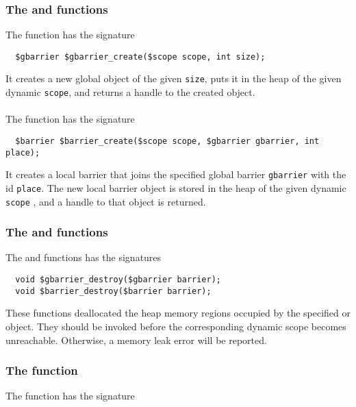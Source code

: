 \subsubsection{The \cgbarriercreate{} and \cbarriercreate{} functions}
The \cgbarriercreate{} function has the signature

\begin{verbatim}
  $gbarrier $gbarrier_create($scope scope, int size);
\end{verbatim}

It creates a new global object of the given \texttt{size}, puts it in the heap of the given dynamic \texttt{scope}, and returns a handle to the created \cgbarrier{} object.
\\~\\
The \cbarriercreate{} function has the signature

\begin{verbatim}
  $barrier $barrier_create($scope scope, $gbarrier gbarrier, int place);
\end{verbatim}

It creates a local barrier that joins the specified global barrier \texttt{gbarrier} with the id \texttt{place}. The new local barrier object is stored in the heap of the given dynamic \texttt{scope} , and a handle to that object is returned.

\subsubsection{The  \cgbarrierdestroy{} and \cbarrierdestroy{} functions}

The \cgbarrierdestroy{} and \cbarrierdestroy{}  functions has the signatures

\begin{verbatim}
  void $gbarrier_destroy($gbarrier barrier);
  void $barrier_destroy($barrier barrier);
\end{verbatim}

These functions deallocated the heap memory regions occupied by the specified \cgbarrier{} or \cbarrier{} object. They should be invoked before the corresponding dynamic scope becomes unreachable. Otherwise, a memory leak error will be reported.

\subsubsection{The  \cbarriercall{} function}

The \cbarriercall{} function has the signature

